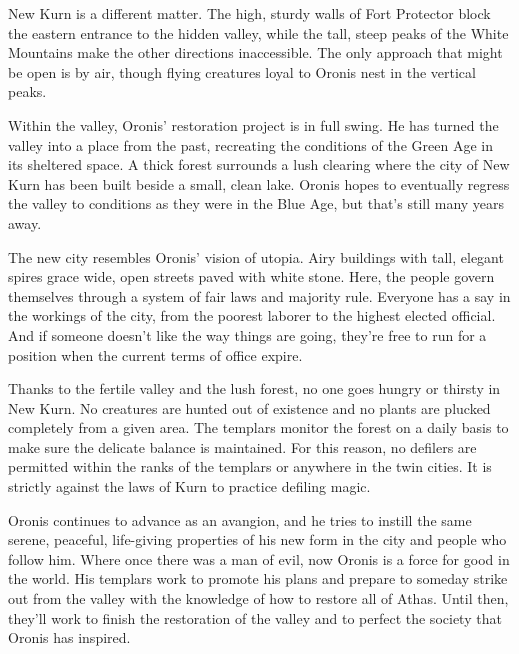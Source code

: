 {	New Kurn is a different matter. The high, sturdy walls of Fort Protector block the eastern entrance to the hidden valley, while the tall, steep peaks of the White Mountains make the other directions inaccessible. The only approach that might be open is by air, though flying creatures loyal to Oronis nest in the vertical peaks.

	Within the valley, Oronis' restoration project is in full swing. He has turned the valley into a place from the past, recreating the conditions of the Green Age in its sheltered space. A thick forest surrounds a lush clearing where the city of New Kurn has been built beside a small, clean lake. Oronis hopes to eventually regress the valley to conditions as they were in the Blue Age, but that's still many years away.

	The new city resembles Oronis' vision of utopia. Airy buildings with tall, elegant spires grace wide, open streets paved with white stone. Here, the people govern themselves through a system of fair laws and majority rule. Everyone has a say in the workings of the city, from the poorest laborer to the highest elected official. And if someone doesn't like the way things are going, they're free to run for a position when the current terms of office expire.

	Thanks to the fertile valley and the lush forest, no one goes hungry or thirsty in New Kurn. No creatures are hunted out of existence and no plants are plucked completely from a given area. The templars monitor the forest on a daily basis to make sure the delicate balance is maintained. For this reason, no defilers are permitted within the ranks of the templars or anywhere in the twin cities. It is strictly against the laws of Kurn to practice defiling magic.

	Oronis continues to advance as an avangion, and he tries to instill the same serene, peaceful, life-giving properties of his new form in the city and people who follow him. Where once there was a man of evil, now Oronis is a force for good in the world. His templars work to promote his plans and prepare to someday strike out from the valley with the knowledge of how to restore all of Athas. Until then, they'll work to finish the restoration of the valley and to perfect the society that Oronis has inspired.
}
